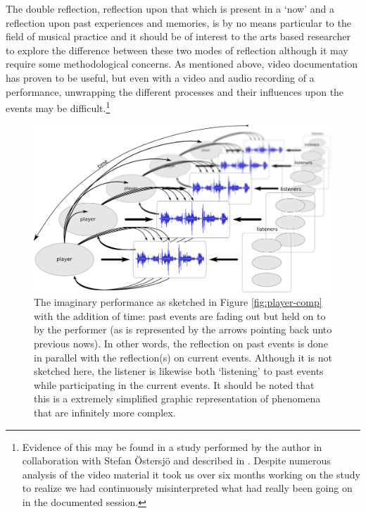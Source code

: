 The double reflection, reflection upon that which is present in a `now' and a reflection upon past experiences and memories, is by no means particular to the field of musical practice and it should be of interest to the arts based researcher to explore the difference between these two modes of reflection although it may require some methodological concerns. As mentioned above, video documentation has proven to be useful, but even with a video and audio recording of a performance, unwrapping the different processes and their influences upon the events may be difficult.\footnote{Evidence of this may be found in a study performed by the author in collaboration with Stefan \"{O}stersj\"{o} and described in \cite{frisk-ost06,frisk-ost06-2}. Despite numerous analysis of the video material it took us over six months working on the study to realize we had continuously misinterpreted what had really been going on in the documented session.} %

\begin{figure}[htb]
  \centering
  \includegraphics[width=\linewidth]{img/players-perspective}
  \caption{The imaginary performance as sketched in Figure \ref{fig:player-comp} with the addition of time: past events are fading out but held on to by the performer (as is represented by the arrows pointing back unto previous nows). In other words, the reflection on past events is done in parallel with the reflection(s) on current events. Although it is not sketched here, the listener is likewise both `listening' to past events while participating in the current events. It should be noted that this is a extremely simplified graphic representation of phenomena that are infinitely more complex.}
  \label{fig:u}
\end{figure}


